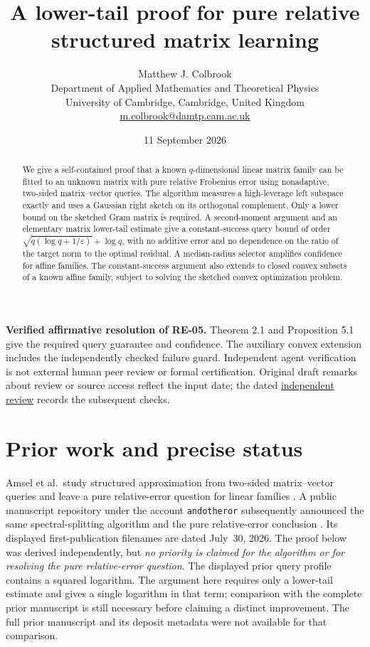 \documentclass[11pt]{article}
\title{A lower-tail proof for pure relative structured matrix learning}
\author{Matthew J. Colbrook\\\small Department of Applied Mathematics and Theoretical Physics\\\small University of Cambridge, Cambridge, United Kingdom\\\small\href{mailto:m.colbrook@damtp.cam.ac.uk}{m.colbrook@damtp.cam.ac.uk}}
\date{11 September 2026}
\theoremstyle{definition}
\newcommand{\eps}{\varepsilon}
\begin{document}
\maketitle

\noindent\textbf{Verified affirmative resolution of RE-05.} Theorem 2.1 and Proposition 5.1 give the required query guarantee and confidence. The auxiliary convex extension includes the independently checked failure guard.
Independent agent verification is not external human peer review or formal certification. Original draft remarks about review or source access reflect the input date; the dated \href{https://github.com/MColbrook/OpenProblemsInNLA/blob/codex/colbrook-transfer-resolutions/references/colbrook-transfer-2026-09-11/verification/reviews/RE-05-review.md}{independent review} records the subsequent checks.
\par\medskip
\begin{abstract}
We give a self-contained proof that a known $q$-dimensional linear matrix family can be fitted to an unknown matrix with pure relative Frobenius error using nonadaptive, two-sided matrix--vector queries. The algorithm measures a high-leverage left subspace exactly and uses a Gaussian right sketch on its orthogonal complement. Only a lower bound on the sketched Gram matrix is required. A second-moment argument and an elementary matrix lower-tail estimate give a constant-success query bound of order $\sqrt{q(\log q+1/\eps)}+\log q$, with no additive error and no dependence on the ratio of the target norm to the optimal residual. A median-radius selector amplifies confidence for affine families. The constant-success argument also extends to closed convex subsets of a known affine family, subject to solving the sketched convex optimization problem.
\end{abstract}

\section{Prior work and precise status}
Amsel et al.\ study structured approximation from two-sided matrix--vector queries and leave a pure relative-error question for linear families \cite{Amsel2026}. A public manuscript repository under the account \texttt{andotheror} subsequently announced the same spectral-splitting algorithm and the pure relative-error conclusion \cite{Prior2026}. Its displayed first-publication filenames are dated July~30, 2026. The proof below was derived independently, but \emph{no priority is claimed for the algorithm or for resolving the pure relative-error question}. The displayed prior query profile contains a squared logarithm. The argument here requires only a lower-tail estimate and gives a single logarithm in that term; comparison with the complete prior manuscript is still necessary before claiming a distinct improvement. The full prior manuscript and its deposit metadata were not available for that comparison.
\end{document}
